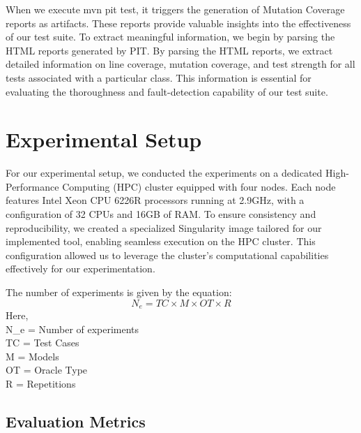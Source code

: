 When we execute mvn pit test, it triggers the generation of Mutation Coverage reports as artifacts. These reports provide valuable insights into the effectiveness of our test suite. To extract meaningful information, we begin by parsing the HTML reports generated by PIT. By parsing the HTML reports, we extract detailed information on line coverage, mutation coverage, and test strength for all tests associated with a particular class. This information is essential for evaluating the thoroughness and fault-detection capability of our test suite.

\section{Experimental Setup}
\label{sec:experimental_setup}
\vspace{0.2 cm}

For our experimental setup, we conducted the experiments on a dedicated High-Performance Computing (HPC) cluster equipped with four nodes. Each node features Intel Xeon CPU 6226R\cite{noauthor_intel_nodate} processors running at 2.9GHz, with a configuration of 32 CPUs and 16GB of RAM. To ensure consistency and reproducibility, we created a specialized Singularity\cite{noauthor_introduction_nodate} image tailored for our implemented tool, enabling seamless execution on the HPC cluster. This configuration allowed us to leverage the cluster's computational capabilities effectively for our experimentation.

The number of experiments is given by the equation:
\[
N_e = TC \times M \times OT \times R
\]
\noindent
Here, \\
N_e = Number of experiments\\
TC = Test Cases\\
M = Models\\
OT = Oracle Type\\
R = Repetitions\\

\vspace{0.1 cm}
\subsection{Evaluation Metrics}
\label{sec:evaluation_metrics}
\vspace{0.1 cm}

